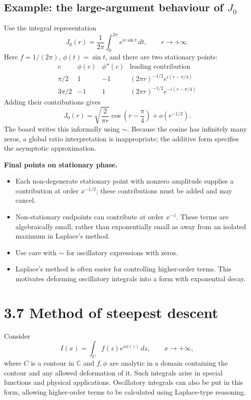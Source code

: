 \documentclass[11pt,a4paper]{article}
\begin{document}
\subsection*{Example: the large-argument behaviour of $J_0$}
Use the integral representation
\[
    J_0(r)=\frac1{2\pi}\int_0^{2\pi}e^{ir\sin t}\,dt,
    \qquad r\to+\infty.
\]
Here $f=1/(2\pi)$, $\phi(t)=\sin t$, and there are two stationary points:
\[
\begin{array}{c|ccc}
    c&\phi(c)&\phi''(c)&\text{leading contribution}\\ \hline
    \pi/2&1&-1&(2\pi r)^{-1/2}e^{i(r-\pi/4)}\\
    3\pi/2&-1&1&(2\pi r)^{-1/2}e^{-i(r-\pi/4)}
\end{array}
\]
Adding their contributions gives
\[
    \boxed{J_0(r)=\sqrt{\frac{2}{\pi r}}
    \cos\!\left(r-\frac\pi4\right)+o(r^{-1/2}).}
\]
The board writes this informally using $\sim$. Because the cosine has
infinitely many zeros, a global ratio interpretation is inappropriate;
the additive form specifies the asymptotic approximation.

\medskip
\noindent\textbf{Final points on stationary phase.}
\begin{itemize}
    \item Each non-degenerate stationary point with nonzero amplitude
    supplies a contribution at order $x^{-1/2}$; these contributions
    must be added and may cancel.
    \item Non-stationary endpoints can contribute at order $x^{-1}$.
    These terms are algebraically small, rather than exponentially
    small as away from an isolated maximum in Laplace's method.
    \item Use care with $\sim$ for oscillatory expressions with zeros.
    \item Laplace's method is often easier for controlling higher-order
    terms. This motivates deforming oscillatory integrals into a form
    with exponential decay.
\end{itemize}

\section*{3.7 Method of steepest descent}
Consider
\[
    I(x)=\int_C f(z)e^{x\phi(z)}\,dz,\qquad x\to+\infty,
\]
where $C$ is a contour in $\mathbb C$ and $f,\phi$ are analytic in a
domain containing the contour and any allowed deformation of it.
Such integrals arise in special functions and physical applications.
Oscillatory integrals can also be put in this form, allowing
higher-order terms to be calculated using Laplace-type reasoning.
\end{document}
